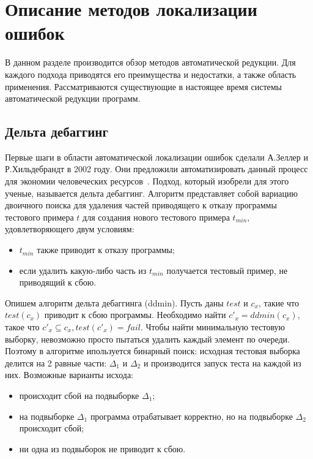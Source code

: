 \chapter{Описание методов локализации ошибок}
В данном разделе производится обзор методов автоматической редукции. Для каждого подхода приводятся его преимущества и недостатки, а также область применения. Рассматриваются существующие в настоящее время системы автоматической редукции программ.
\section{Дельта дебаггинг}
Первые шаги в области автоматической локализации ошибок сделали А.Зеллер и Р.Хильдебрандт в 2002 году. Они предложили автоматизировать данный процесс для экономии человеческих ресурсов~\cite{zeller2002simplifying}. Подход, который изобрели для этого ученые, называется дельта дебаггинг. Алгоритм представляет собой вариацию двоичного поиска для удаления частей приводящего к отказу программы тестового примера $t$ для создания нового тестового примера $t_{min}$, удовлетворяющего двум условиям:
\begin{itemize}
\item $t_{min}$ также приводит к отказу программы;
\item если удалить какую-либо часть из $t_{min}$ получается тестовый пример, не приводящий к сбою.
\end{itemize}
Опишем алгоритм дельта дебаггинга (ddmin). Пусть даны $test$ и $c_x$, такие что $test(c_x)$ приводит к сбою программы. Необходимо найти $c'_x = ddmin(c_x)$, такое что $c'_x \subseteq c_x, test(c'_x) = fail$. Чтобы найти минимальную тестовую выборку, невозможно просто пытаться удалить каждый элемент по очереди. Поэтому в алгоритме ипользуется бинарный поиск: исходная тестовая выборка делится на 2 равные части: $\Delta_1$ и $\Delta_2$ и производится запуск теста на каждой из них. Возможные варианты исхода:
\begin{itemize}
\item происходит сбой на подвыборке $\Delta_1$;
\item на подвыборке $\Delta_1$ программа отрабатывает корректно, но на подвыборке $\Delta_2$ происходит сбой;
\item ни одна из подвыборок не приводит к сбою.
\end{itemize}
